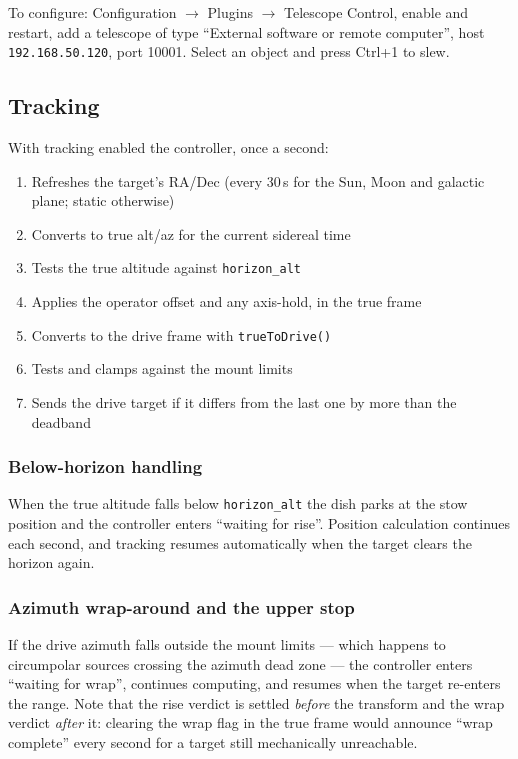 \documentclass[11pt,a4paper]{article}
\begin{document}
To configure: Configuration $\rightarrow$ Plugins $\rightarrow$ Telescope Control, enable and restart, add a telescope of type ``External software or remote computer'', host \texttt{192.168.50.120}, port 10001. Select an object and press Ctrl+1 to slew.

\subsection{Tracking}

With tracking enabled the controller, once a second:

\begin{enumerate}
    \item Refreshes the target's RA/Dec (every 30\,s for the Sun, Moon and galactic plane; static otherwise)
    \item Converts to true alt/az for the current sidereal time
    \item Tests the true altitude against \texttt{horizon\_alt}
    \item Applies the operator offset and any axis-hold, in the true frame
    \item Converts to the drive frame with \texttt{trueToDrive()}
    \item Tests and clamps against the mount limits
    \item Sends the drive target if it differs from the last one by more than the deadband
\end{enumerate}

\subsubsection{Below-horizon handling}

When the true altitude falls below \texttt{horizon\_alt} the dish parks at the stow position and the controller enters ``waiting for rise''. Position calculation continues each second, and tracking resumes automatically when the target clears the horizon again.

\subsubsection{Azimuth wrap-around and the upper stop}

If the drive azimuth falls outside the mount limits --- which happens to circumpolar sources crossing the azimuth dead zone --- the controller enters ``waiting for wrap'', continues computing, and resumes when the target re-enters the range. Note that the rise verdict is settled \emph{before} the transform and the wrap verdict \emph{after} it: clearing the wrap flag in the true frame would announce ``wrap complete'' every second for a target still mechanically unreachable.
\end{document}
